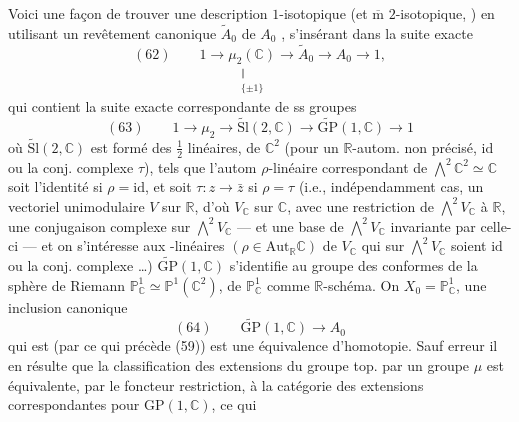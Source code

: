 Voici une façon de trouver une description
$1$-isotopique (et $\overline{\mathrm m}$ $2$-isotopique, )
en utilisant un  revêtement canonique
$\widetilde A_0$ de $A_0$ , s'insérant dans la suite exacte
\[
(62)\qquad
1\longrightarrow\underset{\substack{\Vert\\\{\pm1\}}}{\mu_2(\mathbb C)}
\longrightarrow\widetilde A_0\longrightarrow A_0\longrightarrow1,
\]
qui contient la  suite exacte correspondante
de ss groupes
\[
(63)\qquad
1\longrightarrow\mu_2\longrightarrow\widetilde{\mathrm{Sl}}(2,\mathbb C)
\longrightarrow\widetilde{\mathrm{GP}}(1,\mathbb C)\longrightarrow1
\]
où $\widetilde{\mathrm{Sl}}(2,\mathbb C)$ est formé des  $\frac12$ linéaires,
de $\mathbb C^2$ (pour un $\mathbb R$-autom. \inserted{$\rho$} non précisé,
$\mathrm{id}$ ou la conj. complexe $\tau$), tels que l'autom
$\rho$-linéaire correspondant de $\bigwedge^2\mathbb C^2\simeq\mathbb C$
soit l'identité si $\rho=\mathrm{id}$, et soit $\tau:z\longrightarrow\bar z$
si $\rho=\tau$ (i.e., indépendamment  cas, 
un vectoriel unimodulaire $V$ sur $\mathbb R$, d'où
$V_{\mathbb C}$ sur $\mathbb C$, avec une restriction de $\bigwedge^2 V_{\mathbb C}$ à $\mathbb R$,
 une conjugaison complexe sur $\bigwedge^2 V_{\mathbb C}$
--- et une  base de $\bigwedge^2 V_{\mathbb C}$ invariante par
celle-ci --- et on s'intéresse aux 
-linéaires $(\rho\in\mathrm{Aut}_{\mathbb R}\mathbb C)$ de $V_{\mathbb C}$ qui sur
$\bigwedge^2 V_{\mathbb C}$ soient $\mathrm{id}$ ou la conj. complexe \ldots)
$\widetilde{\mathrm{GP}}(1,\mathbb C)$ s'identifie au groupe des  conformes
de la sphère de Riemann  $\mathbb P^1_{\mathbb C}\simeq\mathbb P^1(\mathbb C^2)$,
  de $\mathbb P^1_{\mathbb C}$ comme $\mathbb R$-schéma.
On  $X_0=\mathbb P^1_{\mathbb C}$, 
une inclusion canonique
\[
(64)\qquad \widetilde{\mathrm{GP}}(1,\mathbb C)\longrightarrow A_0
\]
qui est (par ce qui précède (59)) est une
équivalence d'homotopie. Sauf erreur
il en résulte  que la classification des
extensions du groupe top.  par un groupe
 $\mu$ est équivalente, par le foncteur
restriction, à la catégorie des extensions
correspondantes pour  $\mathrm{GP}(1,\mathbb C)$, ce qui
